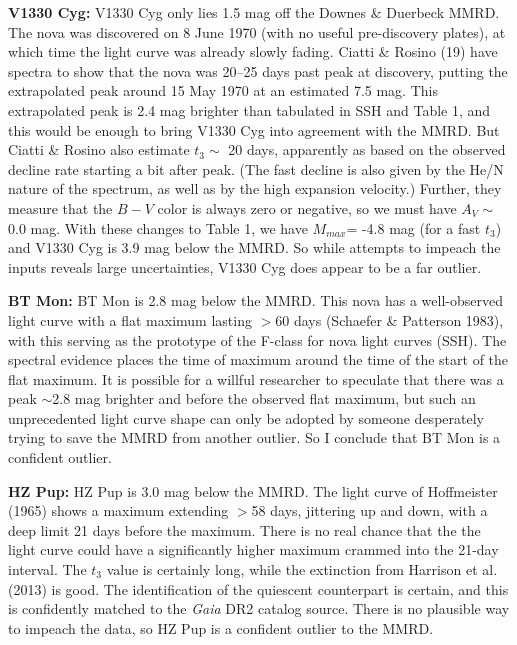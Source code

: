 \documentclass[a4paper,fleqn,usenatbib]{mnras}
\begin{document}
	{\bf V1330 Cyg:}  V1330 Cyg only lies 1.5 mag off the Downes \& Duerbeck MMRD.  The nova was discovered on 8 June 1970 (with no useful pre-discovery plates), at which time the light curve was already slowly fading.  Ciatti \& Rosino (19) have spectra to show that the nova was 20--25 days past peak at discovery, putting the extrapolated peak around 15 May 1970 at an estimated 7.5 mag.  This extrapolated peak is 2.4 mag brighter than tabulated in SSH and Table 1, and this would be enough to bring V1330 Cyg into agreement with the MMRD.  But Ciatti \& Rosino also estimate $t_3 \sim$ 20 days, apparently as based on the observed decline rate starting a bit after peak.  (The fast decline is also given by the He/N nature of the spectrum, as well as by the high expansion velocity.)  Further, they measure that the $B-V$ color is always zero or negative, so we must have $A_V \sim$ 0.0 mag.  With these changes to Table 1, we have $M_{max}$= -4.8 mag (for a fast $t_3$) and V1330 Cyg is 3.9 mag below the MMRD.  So while attempts to impeach the inputs reveals large uncertainties, V1330 Cyg does appear to be a far outlier.

	{\bf BT Mon:}  BT Mon is 2.8 mag below the MMRD.  This nova has a well-observed light curve with a flat maximum lasting $>$60 days (Schaefer \& Patterson 1983), with this serving as the prototype of the F-class for nova light curves (SSH).  The spectral evidence places the time of maximum around the time of the start of the flat maximum.  It is possible for a willful researcher to speculate that there was a peak $\sim$2.8 mag brighter and before the observed flat maximum, but such an unprecedented light curve shape can only be adopted by someone desperately trying to save the MMRD from another outlier.  So I conclude that BT Mon is a confident outlier.

	{\bf HZ Pup:}  HZ Pup is 3.0 mag below the MMRD.  The light curve of Hoffmeister (1965) shows a maximum extending $>$58 days, jittering up and down, with a deep limit 21 days before the maximum.  There is no real chance that the the light curve could have a significantly higher maximum crammed into the 21-day interval.  The $t_3$ value is certainly long, while the extinction from Harrison et al. (2013) is good.  The identification of the quiescent counterpart is certain, and this is confidently matched to the {\it Gaia} DR2 catalog source.  There is no plausible way to impeach the data, so HZ Pup is a confident outlier to the MMRD.
\end{document}
